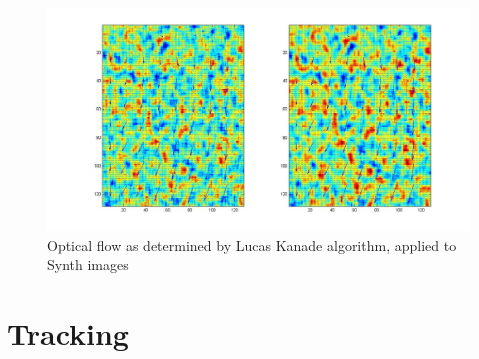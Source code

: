\documentclass[11pt]{article}
\begin{document}
\begin{figure}[H] \centering
	\includegraphics[width=.8\textwidth]{imgs/synth.jpg}
	\caption{Optical flow as determined by Lucas Kanade algorithm, applied to Synth images}
	\label{fig:synth_lucas}
\end{figure}


\section{Tracking}
\end{document}
